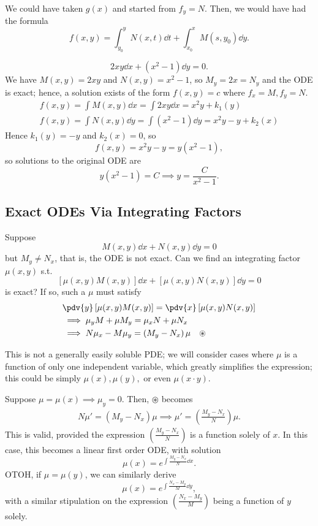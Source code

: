 \begin{remark}
    We could have taken $g(x)$ and started from $f_y = N$. Then, we would have had the formula \[
    f(x, y) = \int_{y_0}^y  N(x, t) \dd{t} + \int_{x_0}^x M(s, y_0) \dd{y}.
    \]
\end{remark}

\begin{example}
    \[
    2xy \dd{x} + (x^2 - 1) \dd{y} = 0.
    \]
    We have $M(x, y) = 2xy$ and $N(x, y) = x^2 - 1$, so $M_y = 2x = N_y$ and the ODE is exact; hence, a solution exists of the form $f(x, y) = c$ where $f_x = M, f_y =N$. \begin{align*}
        f(x, y) = \int M (x, y) \dd{x} = \int 2xy \dd{x} = x^2y + k_1(y)\\
        f(x, y) = \int N(x, y) \dd{y} = \int (x^2 - 1) \dd{y} = x^2y-y + k_2(x)
    \end{align*}
    Hence $k_1(y) = -y$ and $k_2(x) = 0$, so \[
    f(x, y) = x^2y - y = y(x^2 - 1),
    \]
    so solutions to the original ODE are \[
    y(x^2 - 1) = C \implies y = \frac{C}{x^2 - 1}.    
    \]
\end{example}

\subsection{Exact ODEs Via Integrating Factors}

Suppose $$M(x,y)\dd{x} + N(x,y) \dd{y} = 0$$ but $M_y \neq N_x$, that is, the ODE is not exact. Can we find an integrating factor $\mu(x, y)$ s.t. \[
\left[\mu(x, y) M(x, y)\right]\dd{x} + \left[\mu(x, y) N(x, y)\right]\dd{y} = 0
\]
is exact? If so, such a $\mu$ must satisfy \begin{align*}
    &\pdv{y} \left[\mu(x, y) M(x, y)\right] = \pdv{x} \left[\mu(x, y) N(x, y)\right]\\
    &\implies \mu_y M + \mu M_y = \mu_x N + \mu N_x\\
    &\implies N \mu_x - M \mu_y = \left(M_y - N_x\right)\mu \quad \circledast
\end{align*}

This is not a generally easily soluble PDE; we will consider cases where $\mu$ is a function of only one independent variable, which greatly simplifies the expression; this could be simply $\mu(x), \mu(y), $ or even $\mu(x\cdot y)$.

Suppose $\mu = \mu(x) \implies \mu_y = 0$. Then, $\circledast$ becomes \begin{align*}
N \mu' = (M_y - N_x) \mu 
\implies \mu' = \left(\frac{M_y - N_x}{N}\right)\mu.
\end{align*}
This is valid, provided the expression $\left(\frac{M_y - N_x}{N}\right)$ is a function solely of $x$. In this case, this becomes a linear first order ODE, with solution \[
\mu(x) = e^{\int \frac{M_y - N_x}{N} \dd{x}}.
\]
OTOH, if $\mu = \mu(y)$, we can similarly derive \[
\mu(x) = e^{\int \frac{N_x - M_y}{M} \dd{y}},
\]
with a similar stipulation on the expression $\left(\frac{N_x - M_y}{M}\right)$ being a function of $y$ solely.

